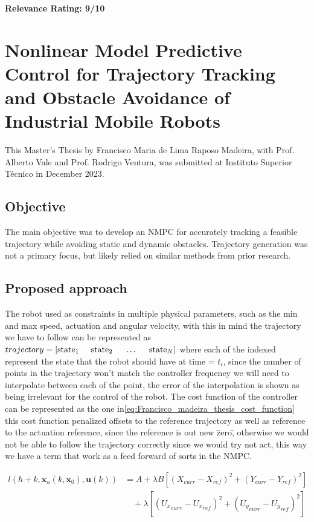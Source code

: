 \documentclass[a4paper,12pt]{article}
\begin{document}
\textbf{Relevance Rating: 9/10}

\section{Nonlinear Model Predictive Control for Trajectory Tracking and Obstacle Avoidance of Industrial Mobile Robots}\label{sec:Francisco_Madeira_Thesis_NMPC_for_reference_tracking_in_industrial_mobile_robots}
This Master's Thesis by Francisco Maria de Lima Raposo Madeira, with Prof.
Alberto Vale and Prof. Rodrigo Ventura, was submitted at Instituto Superior
Técnico in December 2023.

\subsection{Objective}
The main objective was to develop an NMPC for accurately tracking a feasible
trajectory while avoiding static and dynamic obstacles. Trajectory generation
was not a primary focus, but likely relied on similar methods from prior
research.

\subsection{Proposed approach}
The robot used as constraints in multiple physical parameters, such as the min and max speed, actuation and angular velocity, with this in mind the trajectory we have to follow can be represented as $trajectory =  \left[\text{state}_{1} \hspace{0.5cm} \text{state}_{2}  \hspace{0.5cm} \dots \hspace{0.5cm} \text{state}_{N} \right]$ where each of the indexed represent the state that the robot should have at time = $t_{i}$, since the number of points in the trajectory won't match the controller frequency we will need to interpolate between each of the point, the error of the interpolation is shown as being irrelevant for the control of the robot. The cost function of the controller can be represented as the one in\ref{eq:Francisco_madeira_thesis_cost_function} this cost function penalized offsets to the reference trajectory as well as reference to the actuation reference, since the reference is out new \"zero\", otherwise we would not be able to follow the trajectory correctly since we would try not act, this way we have a term that work as a feed forward of sorts in the NMPC.

\begin{align}
	l(h + k, \textbf{x}_{u}(k, \textbf{x}_{0}), \textbf{u}(k)) & = A + \lambda B \left[
	\left( X_{curr} - X_{ref} \right)^2 + \left( Y_{curr} - Y_{ref} \right)^2  \right] \nonumber                                                                                          \\
	                                                           & \quad + \lambda \left[ \left( {U_{x}}_{curr} - {U_{x}}_{ref} \right)^2 + \left( {U_{y}}_{curr} - {U_{y}}_{ref} \right)^2
		\right]
	\label{eq:Francisco_madeira_thesis_cost_function}
\end{align}
\end{document}
